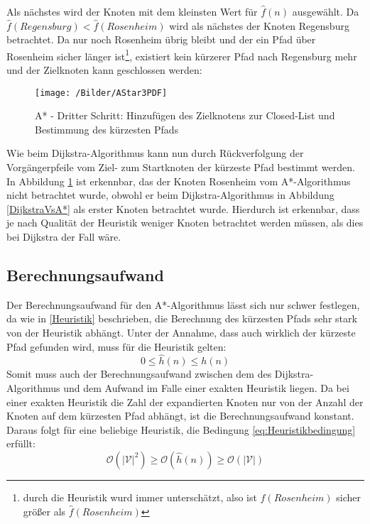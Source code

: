 		Als nächstes wird der Knoten mit dem kleinsten Wert  für $\hat{f}(n)$ ausgewählt. Da $\hat{f}(Regensburg)<\hat{f}(Rosenheim)$ wird als nächstes der Knoten Regensburg betrachtet. Da nur noch Rosenheim übrig bleibt und der ein Pfad über Rosenheim sicher länger ist\footnote{durch die Heuristik wurd immer unterschätzt, also ist $f(Rosenheim)$ sicher größer als $\hat{f}(Rosenheim)$}, existiert kein kürzerer Pfad nach Regensburg mehr und der Zielknoten kann geschlossen werden:

		\begin{figure}[H]
			\centering
			\texttt{[image: /Bilder/AStar3PDF]}
			\vspace{0.2cm}
			\caption{A* - Dritter Schritt: Hinzufügen des Zielknotens zur Closed-List und Bestimmung des kürzesten Pfads} \label{A*3}
		\end{figure}
		
		Wie beim Dijkstra-Algorithmus kann nun durch Rückverfolgung der Vorgängerpfeile vom Ziel- zum Startknoten der kürzeste Pfad bestimmt werden. In Abbildung \ref{A*3} ist erkennbar, das der Knoten Rosenheim vom A*-Algorithmus nicht betrachtet wurde, obwohl er beim Dijkstra-Algorithmus in Abbildung \ref{DijkstraVsA*} als erster Knoten betrachtet wurde. Hierdurch ist erkennbar, dass je nach Qualität der Heuristik weniger Knoten betrachtet werden müssen, als dies bei Dijkstra der Fall wäre.
	
	\subsection{Berechnungsaufwand}
		\label{Aufwand_A*}
		Der Berechnungsaufwand für den A*-Algorithmus lässt sich nur schwer festlegen, da wie in \ref{Heuristik} beschrieben, die Berechnung des kürzesten Pfads sehr stark von der Heuristik abhängt. Unter der Annahme, dass auch wirklich der kürzeste Pfad gefunden wird, muss für die Heuristik gelten:
		\begin{equation} \label{eq:Heuristikbedingung}
			0\le \hat{h}(n)\le h(n)
		\end{equation}
		Somit muss auch der Berechnungsaufwand zwischen dem des Dijkstra-Algorithmus und dem Aufwand im Falle einer exakten Heuristik liegen. Da bei einer exakten Heuristik die Zahl der expandierten Knoten nur von der Anzahl der Knoten auf dem kürzesten Pfad abhängt, ist die Berechnungsaufwand konstant. Daraus folgt für eine beliebige Heuristik, die Bedingung \ref{eq:Heuristikbedingung} erfüllt:
		\begin{equation}
			\mathcal{O}(\lvert \mathcal{V}\rvert ^2)\ge \mathcal{O}(\hat{h}(n))\ge \mathcal{O}(\lvert \mathcal{V}\rvert)
		\end{equation}
		
